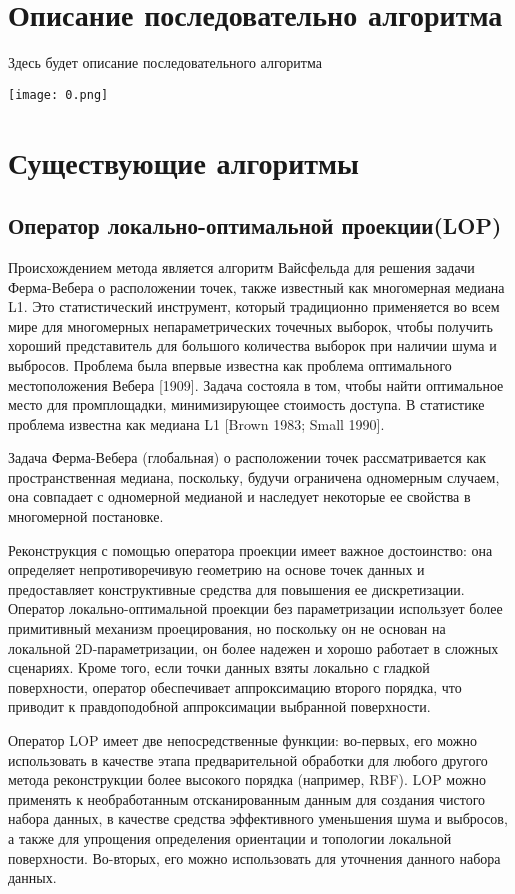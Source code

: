 

\section{Описание последовательно алгоритма}
Здесь будет описание последовательного алгоритма  

\texttt{[image: 0.png]}


\section{Существующие алгоритмы}
\subsection{Оператор локально-оптимальной проекции(LOP)}
Происхождением метода является алгоритм Вайсфельда для решения задачи Ферма-Вебера о расположении точек, также известный как многомерная медиана L1. Это статистический инструмент, который традиционно применяется во всем мире для многомерных непараметрических точечных выборок, чтобы получить хороший представитель для большого количества выборок при наличии шума и выбросов. Проблема была впервые известна как проблема оптимального местоположения Вебера [1909]. Задача состояла в том, чтобы найти оптимальное место для промплощадки, минимизирующее стоимость доступа. В статистике проблема известна как медиана L1 [Brown 1983; Small 1990].

Задача Ферма-Вебера (глобальная) о расположении точек рассматривается как пространственная медиана, поскольку, будучи ограничена одномерным случаем, она совпадает с одномерной медианой и наследует некоторые ее свойства в многомерной постановке.

Реконструкция с помощью оператора проекции имеет важное достоинство: она определяет непротиворечивую геометрию на основе точек данных и предоставляет конструктивные средства для повышения ее дискретизации. 
Оператор локально-оптимальной проекции без параметризации использует более примитивный механизм проецирования, но поскольку он не основан на локальной 2D-параметризации, он более надежен и хорошо работает в сложных сценариях. Кроме того, если точки данных взяты локально с гладкой поверхности, оператор обеспечивает аппроксимацию второго порядка, что приводит к правдоподобной аппроксимации выбранной поверхности.

Оператор LOP имеет две непосредственные функции: во-первых, его можно использовать в качестве этапа предварительной обработки для любого другого метода реконструкции более высокого порядка (например, RBF). LOP можно применять к необработанным отсканированным данным для создания чистого набора данных, в качестве средства эффективного уменьшения шума и выбросов, а также для упрощения определения ориентации и топологии локальной поверхности. Во-вторых, его можно использовать для уточнения данного набора данных.

